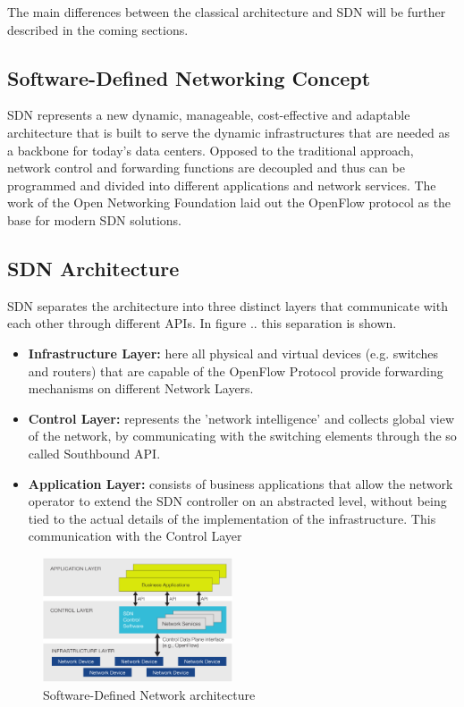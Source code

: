 The main differences between the classical architecture and SDN will be further described in the coming sections.

\subsection{Software-Defined Networking Concept}

SDN represents a new dynamic, manageable, cost-effective and adaptable architecture \cite{onfdefinition} that is built to serve the dynamic infrastructures that are needed as a backbone for today's data centers. Opposed to the traditional approach, network control and forwarding functions are decoupled and thus can be programmed and divided into different applications and network services.
The work of the Open Networking Foundation laid out the OpenFlow protocol as the base for modern SDN solutions.

\subsection{SDN Architecture}

SDN separates the architecture into three distinct layers that communicate with each other through different APIs. In figure .. %
 this separation is shown.

\begin{itemize}
\item \textbf{Infrastructure Layer:} here all physical and virtual devices (e.g. switches and routers) that are capable of the OpenFlow Protocol provide forwarding mechanisms on different Network Layers.
\item \textbf{Control Layer:} represents the 'network intelligence' and collects global view of the network, by communicating with the switching elements through the so called Southbound API.
\item \textbf{Application Layer:} consists of business applications that allow the network operator to extend the SDN controller on an abstracted level, without being tied to the actual details of the implementation of the infrastructure. This communication with the Control Layer


\end{itemize}

\begin{figure}[H]
\centering

\includegraphics[width=0.5\textwidth]{images/fundamentals/sdn_logical_architecture.png}

\caption{Software-Defined Network architecture}
\end{figure}

